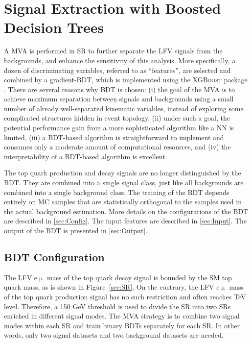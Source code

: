 \chapter{Signal Extraction with Boosted Decision Trees}
\label{chap:BDT}

A \ac{MVA} is performed in \ac{SR} to further separate the LFV signals from the backgrounds, and enhance the sensitivity of this analysis. More specifically, a dozen of discriminating variables, referred to as ``features'', are selected and combined by a gradient-\ac{BDT}, which is implemented using the \textsc{XGBoost} package \cite{Chen:2016:XST:2939672.2939785}. There are several reasons why \ac{BDT} is chosen: (i) the goal of the \ac{MVA} is to achieve maximum separation between signals and backgrounds using a small number of already well-separated kinematic variables, instead of exploring some complicated structures hidden in event topology, (ii) under such a goal, the potential performance gain from a more sophisticated algorithm like a \ac{NN} is limited, (iii) a \ac{BDT}-based algorithm is straightforward to implement and consumes only a moderate amount of computational resources, and (iv) the interpretability of a \ac{BDT}-based algorithm is excellent. 

The top quark production and decay signals are no longer distinguished by the \ac{BDT}. They are combined into a single signal class, just like all backgrounds are combined into a single background class. The training of the \ac{BDT} depends entirely on \ac{MC} samples that are statistically orthogonal to the samples used in the actual background estimation. More details on the configurations of the \ac{BDT} are described in \autoref{sec:Config}. The input features are described in \autoref{sec:Input}. The output of the \ac{BDT} is presented in \autoref{sec:Output}.

\section{BDT Configuration}
\label{sec:Config}

The LFV e$\upmu$ mass of the top quark decay signal is bounded by the \ac{SM} top quark mass, as is shown in Figure~\ref{sec:SR}. On the contrary, the LFV e$\upmu$ mass of the top quark production signal has no such restriction and often reaches TeV level. Therefore, a 150 GeV threshold is used to divide the \ac{SR} into two \acp{SR} enriched in different signal modes. The \ac{MVA} strategy is to combine two signal modes within each \ac{SR} and train binary \acp{BDT} separately for each \ac{SR}. In other words, only two signal datasets and two background datasets are needed.
  
